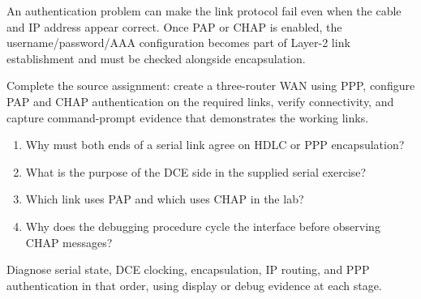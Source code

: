 \begin{pitfall}
An authentication problem can make the link protocol fail even when the cable and IP address appear correct. Once PAP or CHAP is enabled, the username/password/AAA configuration becomes part of Layer-2 link establishment and must be checked alongside encapsulation.
\end{pitfall}

\begin{tryit}
Complete the source assignment: create a three-router WAN using PPP, configure PAP and CHAP authentication on the required links, verify connectivity, and capture command-prompt evidence that demonstrates the working links.
\end{tryit}

\begin{quickcheck}
\begin{enumerate}
\item Why must both ends of a serial link agree on HDLC or PPP encapsulation?
\item What is the purpose of the DCE side in the supplied serial exercise?
\item Which link uses PAP and which uses CHAP in the lab?
\item Why does the debugging procedure cycle the interface before observing CHAP messages?
\end{enumerate}
\end{quickcheck}

\begin{chapterrecap}
Diagnose serial state, DCE clocking, encapsulation, IP routing, and PPP authentication in that order, using display or debug evidence at each stage.
\end{chapterrecap}


